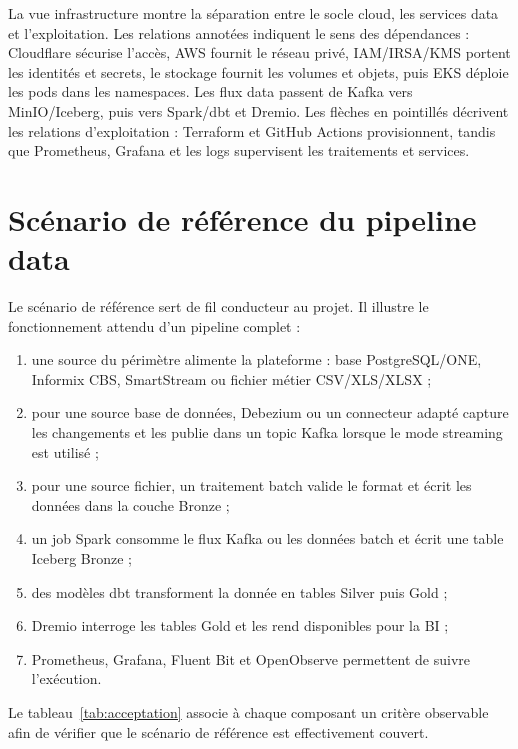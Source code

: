 La vue infrastructure montre la séparation entre le socle cloud, les services data et l'exploitation. Les relations annotées indiquent le sens des dépendances : Cloudflare sécurise l'accès, AWS fournit le réseau privé, IAM/IRSA/KMS portent les identités et secrets, le stockage fournit les volumes et objets, puis EKS déploie les pods dans les namespaces. Les flux data passent de Kafka vers MinIO/Iceberg, puis vers Spark/dbt et Dremio. Les flèches en pointillés décrivent les relations d'exploitation : Terraform et GitHub Actions provisionnent, tandis que Prometheus, Grafana et les logs supervisent les traitements et services.

\section{Scénario de référence du pipeline data}

Le scénario de référence sert de fil conducteur au projet. Il illustre le fonctionnement attendu d'un pipeline complet :
\begin{enumerate}
    \item une source du périmètre alimente la plateforme : base PostgreSQL/ONE, Informix CBS, SmartStream ou fichier métier CSV/XLS/XLSX ;
    \item pour une source base de données, Debezium ou un connecteur adapté capture les changements et les publie dans un topic Kafka lorsque le mode streaming est utilisé ;
    \item pour une source fichier, un traitement batch valide le format et écrit les données dans la couche Bronze ;
    \item un job Spark consomme le flux Kafka ou les données batch et écrit une table Iceberg Bronze ;
    \item des modèles dbt transforment la donnée en tables Silver puis Gold ;
    \item Dremio interroge les tables Gold et les rend disponibles pour la BI ;
    \item Prometheus, Grafana, Fluent Bit et OpenObserve permettent de suivre l'exécution.
\end{enumerate}

Le tableau~\ref{tab:acceptation} associe à chaque composant un critère observable afin de vérifier que le scénario de référence est effectivement couvert.

